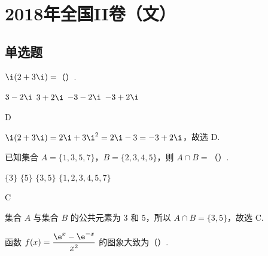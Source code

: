 
\chapter{2018年全国II卷（文）}

\section{单选题}

\begin{problem}
\(\i(2+3\i)=\)（\quad）.

\choices
    {\(3-2\i\)}
    {\(3+2\i\)}
    {\(-3-2\i\)}
    {\(-3+2\i\)}
\end{problem}

\begin{answer}
D
\end{answer}

\begin{solution}
\(\i(2+3\i)=2\i+3\i^2=2\i-3=-3+2\i\)，故选 D.
\end{solution}

\begin{problem}
已知集合 \(A=\{1,3,5,7\}\)，\(B=\{2,3,4,5\}\)，则 \(A\cap B=\)（\quad）.

\choices
    {\(\{3\}\)}
    {\(\{5\}\)}
    {\(\{3,5\}\)}
    {\(\{1,2,3,4,5,7\}\)}
\end{problem}

\begin{answer}
C
\end{answer}

\begin{solution}
集合 \(A\) 与集合 \(B\) 的公共元素为 \(3\) 和 \(5\)，所以 \(A\cap B=\{3,5\}\)，故选 C.
\end{solution}

\begin{problem}
函数 \(f(x)=\dfrac{\e^x-\e^{-x}}{x^2}\) 的图象大致为（\quad）.

    {}
    {}
    {}
\end{problem}

